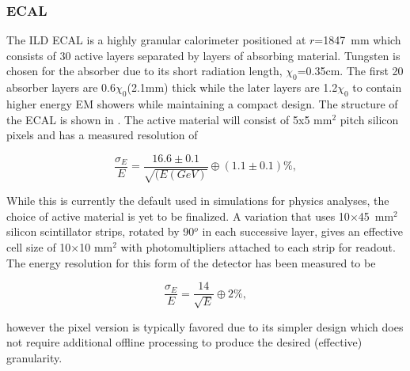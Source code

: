 \subsubsection{ECAL}
The \ac{ILD} \ac{ECAL} is a highly granular calorimeter positioned at $r$=1847~mm which consists of 30 active layers separated by layers of absorbing material. Tungsten is chosen for the absorber due to its short radiation length, $\chi_0$=0.35cm. The first 20 absorber layers are 0.6$\chi_0$(2.1mm) thick while the later layers are  1.2$\chi_0$ to contain higher energy \ac{EM} showers while maintaining a compact design. The structure of the \ac{ECAL} is shown in . The active material will consist of 5x5 mm$^2$ pitch silicon pixels and has a measured resolution of \cite{Adloff:2008aa}

\begin{equation}
  \frac{\sigma_E}{E}=\frac{16.6\pm 0.1}{\sqrt{(E(GeV)}}\oplus(1.1\pm 0.1)\%,
\end{equation}

While this is currently the default used in simulations for physics analyses, the choice of active material is yet to be finalized. A variation that uses 10$\times$45~mm$^2$ silicon scintillator strips, rotated by 90${^o}$ in each successive layer, gives an effective cell size of 10$\times$10 mm$^2$ with photomultipliers attached to each strip for readout. The energy resolution for this form of the detector has been measured to be \cite{ILCTDR}

\begin{equation}
  \frac{\sigma_E}{E}=\frac{14}{\sqrt{E}}\oplus2\%,
\end{equation}

however the pixel version is typically favored due to its simpler design which does not require additional offline processing to produce the desired (effective) granularity.

